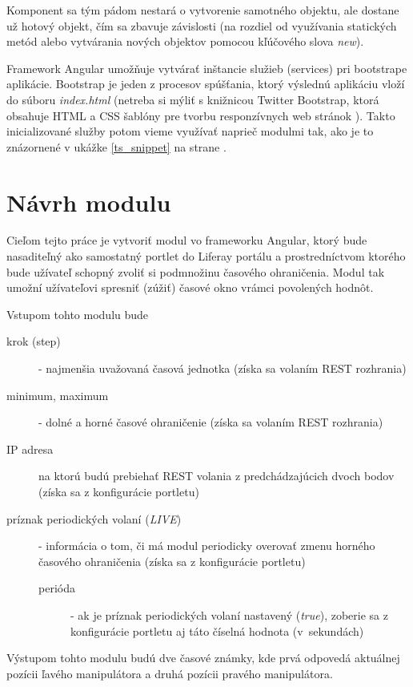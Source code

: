 \documentclass[
  digital, %
  twoside, %
  notable,   %
  nolof,   %
  nolot,   %
]{fithesis3}
\begin{document}
Komponent sa tým pádom nestará o vytvorenie samotného objektu, ale dostane už hotový objekt, čím sa zbavuje závislosti (na rozdiel od využívania statických metód alebo vytvárania nových objektov pomocou kľúčového slova \textit{new}).

Framework Angular umožňuje vytvárať inštancie služieb (services) pri bootstrape aplikácie. Bootstrap je jeden z procesov spúšťania, ktorý výslednú aplikáciu vloží do súboru \textit{index.html} \cite{angular} (netreba si mýliť s knižnicou Twitter Bootstrap, ktorá obsahuje HTML a CSS šablóny pre tvorbu responzívnych web stránok \cite{peska2017thesis}). Takto inicializované služby potom vieme využívať naprieč modulmi tak, ako je to znázornené v ukážke \ref{ts_snippet} na strane \pageref{ts_snippet}.

\chapter{Návrh modulu}
Cieľom tejto práce je vytvoriť modul vo frameworku Angular, ktorý bude nasaditeľný ako samostatný portlet do Liferay portálu a prostredníctvom ktorého bude užívateľ schopný zvoliť si podmnožinu časového ohraničenia. Modul tak umožní užívateľovi spresniť (zúžiť) časové okno vrámci povolených hodnôt.

Vstupom tohto modulu bude
\begin{description}
\item[krok (step)] - najmenšia uvažovaná časová jednotka (získa sa volaním REST rozhrania)
\item[minimum, maximum] - dolné a horné časové ohraničenie (získa sa volaním REST rozhrania)
\item[IP adresa] na ktorú budú prebiehať REST volania z predchádzajúcich dvoch bodov (získa sa z konfigurácie portletu)
\item[príznak periodických volaní (\textit{LIVE})] - informácia o tom, či má modul periodicky overovať zmenu horného časového ohraničenia (získa sa z konfigurácie portletu)
\begin{description}
\item[perióda] - ak je príznak periodických volaní nastavený (\textit{true}), zoberie sa z konfigurácie portletu aj táto číselná hodnota (v~sekundách)
\end{description}
\end{description}
Výstupom tohto modulu budú dve časové známky, kde prvá odpovedá aktuálnej pozícii ľavého manipulátora a druhá pozícii pravého manipulátora.
\end{document}
